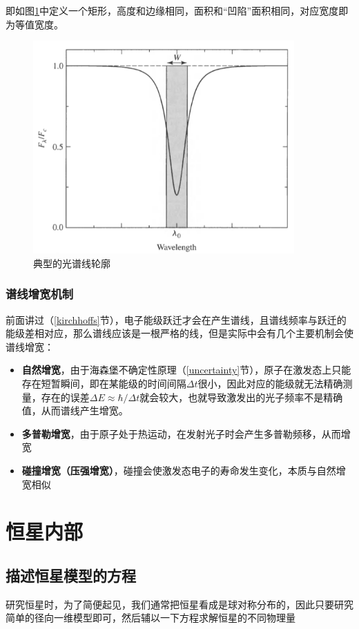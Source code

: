 \documentclass[openany]{ctexbook}
\begin{document}
即如图\ref{fig:spectrum}中定义一个矩形，高度和边缘相同，面积和``凹陷''面积相同，对应宽度即为等值宽度。

\begin{figure}[hbt]
  \centering
  \includegraphics[width=10cm]{chapters/09/spectrum}
  \caption{典型的光谱线轮廓}
  \label{fig:spectrum}
\end{figure}

\subsection{谱线增宽机制}
前面讲过（\ref{kirchhoffs}节），电子能级跃迁才会在产生谱线，且谱线频率与跃迁的能级差相对应，那么谱线应该是一根严格的线，但是实际中会有几个主要机制会使谱线增宽：
\begin{itemize}
  \item \textbf{自然增宽}，由于海森堡不确定性原理（\ref{uncertainty}节），原子在激发态上只能存在短暂瞬间，即在某能级的时间间隔$\Delta t$很小，因此对应的能级就无法精确测量，存在的误差$\Delta E\approx\hbar/\Delta t$就会较大，也就导致激发出的光子频率不是精确值，从而谱线产生增宽。
  \item \textbf{多普勒增宽}，由于原子处于热运动，在发射光子时会产生多普勒频移，从而增宽
  \item \textbf{碰撞增宽（压强增宽）}，碰撞会使激发态电子的寿命发生变化，本质与自然增宽相似
\end{itemize}

\chapter{恒星内部}
\section{描述恒星模型的方程}
研究恒星时，为了简便起见，我们通常把恒星看成是球对称分布的，因此只要研究简单的径向一维模型即可，然后辅以一下方程求解恒星的不同物理量
\end{document}
